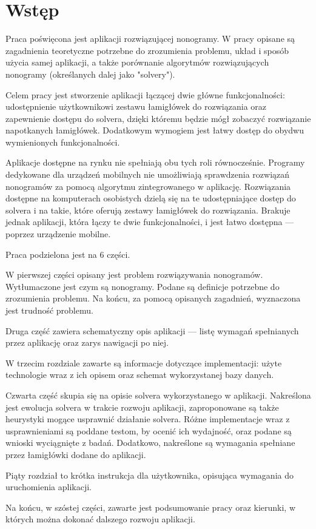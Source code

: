 \chapter*{Wstęp}

\thispagestyle{chapterBeginStyle}

	Praca poświęcona jest aplikacji rozwiązującej nonogramy. W pracy opisane są zagadnienia
teoretyczne potrzebne do zrozumienia problemu, układ i sposób użycia samej aplikacji, a także
porównanie algorytmów rozwiązujących nonogramy (określanych dalej jako "solvery").

	Celem pracy jest stworzenie aplikacji łączącej dwie główne funkcjonalności: udostępnienie
użytkownikowi zestawu łamigłówek do rozwiązania oraz zapewnienie dostępu do solvera, dzięki
któremu będzie mógł zobaczyć rozwiązanie napotkanych łamigłówek. Dodatkowym wymogiem jest łatwy
dostęp do obydwu wymienionych funkcjonalności.

	Aplikacje dostępne na rynku nie spełniają obu tych roli równocześnie. Programy dedykowane dla
urządzeń mobilnych nie umożliwiają sprawdzenia rozwiązań nonogramów za pomocą algorytmu
zintegrowanego w aplikację. Rozwiązania dostępne na komputerach osobistych dzielą się na te udostępniające
dostęp do solvera i na takie, które oferują zestawy łamigłówek do rozwiązania. Brakuje jednak
aplikacji, która łączy te dwie funkcjonalności, i jest łatwo dostępna — poprzez urządzenie mobilne.

	Praca podzielona jest na 6 części.

	W pierwszej części opisany jest problem rozwiązywania nonogramów. Wytłumaczone jest
czym są nonogramy. Podane są definicje potrzebne do zrozumienia problemu. Na końcu, za pomocą
opisanych zagadnień, wyznaczona jest trudność problemu.

	Druga część zawiera schematyczny opis aplikacji — listę wymagań spełnianych przez
aplikację oraz zarys nawigacji po niej.

	W trzecim rozdziale zawarte są informacje dotyczące implementacji: użyte technologie wraz
z ich opisem oraz schemat wykorzystanej bazy danych.

	Czwarta część skupia się na opisie solvera wykorzystanego w aplikacji. Nakreślona jest ewolucja
solvera w trakcie rozwoju aplikacji, zaproponowane są także heurystyki mogące usprawnić działanie
solvera. Różne implementacje wraz z usprawnieniami są poddane testom, by ocenić ich wydajność,
oraz podane są wnioski wyciągnięte z badań. Dodatkowo, nakreślone są wymagania spełniane przez
łamigłówki dodane do aplikacji.

	Piąty rozdział to krótka instrukcja dla użytkownika, opisująca wymagania do uruchomienia aplikacji.

	Na końcu, w szóstej części, zawarte jest podsumowanie pracy oraz kierunki, w których
można dokonać dalszego rozwoju aplikacji.
